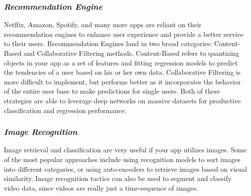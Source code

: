 \subsubsection{\textit{Recommendation Engine}}
Netflix, Amazon, Spotify, and many more apps are reliant on their recommendation engines to enhance user experience and provide a better service to their users. Recommendation Engines land in two broad categories: Content-Based and Collaborative Filtering methods. Content-Based refers to quantizing objects in your app as a set of features and fitting regression models to predict the tendencies of a user based on his or her own data. Collaborative Filtering is more difficult to implement, but performs better as it incorporates the behavior of the entire user base to make predictions for single users. Both of these strategies are able to leverage deep networks on massive datasets for productive classification and regression performance.

\subsubsection{\textit{Image Recognition}}
Image retrieval and classification are very useful if your app utilizes images. Some of the most popular approaches include using recognition models to sort images into different categories, or using auto-encoders to retrieve images based on visual similarity. Image recognition tactics can also be used to segment and classify video data, since videos are really just a time-sequence of images.


